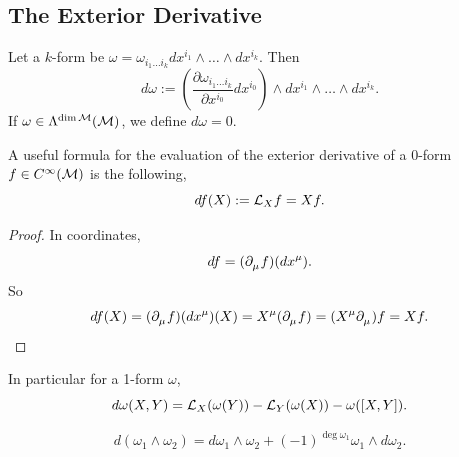 \documentclass[../main.tex]{subfiles}
\begin{document}
    \subsection{The Exterior Derivative}
    \begin{definition}\label{def:exterior-derivative}
        Let a \(k\)-form be
        \(\omega = \omega_{i_1\dots i_k} dx^{i_1} \wedge \dots \wedge dx^{i_k}\). 
        Then 
        \[
        d\omega := \left(\frac{\partial \omega_{i_1\dots i_k}}{\partial x^{i_0}}
        dx^{i_0}\right) 
        \wedge dx^{i_1} \wedge \dots \wedge dx^{i_k}.
        \]
        If \(\omega \in \form{\dim \manifold[M]}{M}\), we define \(d\omega=0\).
    \end{definition}
    \begin{theorem}
        A useful formula for the evaluation of the exterior derivative of 
        a 0-form \(f \in C^\infty(\manifold[M])\) is the following,
        \[
        df(X) := \lder{X}f = Xf.
        \]
    \end{theorem}
    \begin{proof}
        In coordinates, 
        \[
        df = (\tfld{\mu}f)(dx^\mu).
        \]
        So
        \[
        df(X) = (\tfld{\mu}f)(dx^\mu)(X) = X^\mu(\tfld{\mu}f)
        =(X^\mu\tfld{\mu})f=Xf.
        \]
    \end{proof}
    \begin{theorem}\label{thm:exterior-derivative-one-form}
        In particular for a 1-form \(\omega\), 
        \[
        d\omega(X, Y) = \lder{X}(\omega(Y)) - \lder{Y}(\omega(X)) - \omega([X, Y]).
        \]
    \end{theorem}
    \begin{theorem}\label{thm:exterior-leibniz}
        \[
        d(\omega_1 \wedge \omega_2) = d\omega_1 \wedge \omega_2 + 
        (-1)^{\deg \omega_1}\omega_1 \wedge d\omega_2.
        \]
    \end{theorem}
\end{document}

